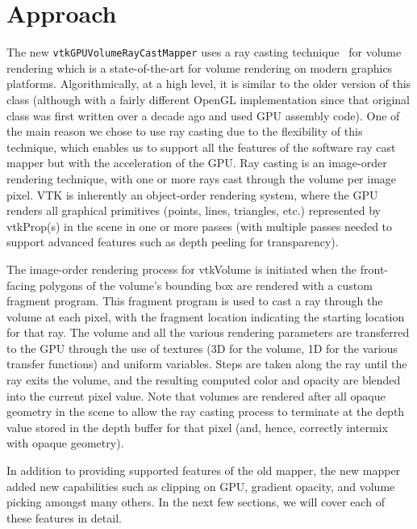 \section{Approach}
\label{approach}
The new \texttt{vtkGPUVolumeRayCastMapper} uses a ray casting
technique~\citep{hadwiger_real-time_2006} for volume rendering which is a
state-of-the-art for volume rendering on modern graphics platforms.
Algorithmically, at a high level, it is similar to the older version of this
class (although with a fairly different OpenGL implementation since that
original class was first written over a decade ago and used GPU assembly code).
One of the main reason we chose to use ray casting due to the flexibility of
this technique, which enables us to support all the features of the software ray
cast mapper but with the acceleration of the GPU. Ray casting is an image-order
rendering technique, with one or more rays cast through the volume per image
pixel. VTK is inherently an object-order rendering system, where the GPU renders
all graphical primitives (points, lines, triangles, etc.) represented by
vtkProp(s) in the scene in one or more passes (with multiple passes needed to
support advanced features such as depth peeling for transparency).

The image-order rendering process for vtkVolume is initiated when the
front-facing polygons of the volume’s bounding box are rendered with a custom
fragment program. This fragment program is used to cast a ray through the volume
at each pixel, with the fragment location indicating the starting location for
that ray. The volume and all the various rendering parameters are transferred to
the GPU through the use of textures (3D for the volume, 1D for the various
transfer functions) and uniform variables. Steps are taken along the ray until
the ray exits the volume, and the resulting computed color and opacity are
blended into the current pixel value. Note that volumes are rendered after all
opaque geometry in the scene to allow the ray casting process to terminate at
the depth value stored in the depth buffer for that pixel (and, hence, correctly
intermix with opaque geometry).

In addition to providing supported features of the old mapper, the new mapper
added new capabilities such as clipping on GPU,  gradient opacity, and volume
picking amongst many others. In the next few sections, we will cover each of
these features in detail.

